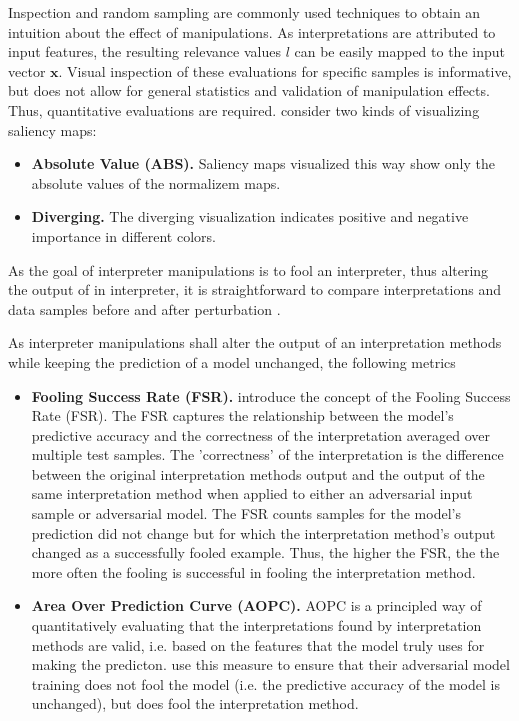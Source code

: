Inspection and random sampling are commonly used techniques to obtain an intuition about the effect of manipulations. 
As interpretations are attributed to input features, the resulting relevance values $l$ can be easily mapped to the input vector $\mathbf{x}$. Visual inspection of these evaluations for specific samples is informative, but does not allow for general statistics and validation of manipulation effects. Thus, quantitative evaluations are required. 
\cite{adebayo2018sanity} consider two kinds of visualizing saliency maps: 
\begin{itemize}
    \item \textbf{Absolute Value (ABS).} Saliency maps visualized this way show only the absolute values of the normalizem maps.
    \item \textbf{Diverging. } The diverging visualization indicates positive and negative importance in different colors. 
\end{itemize}

As the goal of interpreter manipulations is to fool an interpreter, thus altering the output of in interpreter, it is straightforward to compare interpretations and data samples before and after perturbation \cite{ghorbani2019interpretation}.

As interpreter manipulations shall alter the output of an interpretation methods while keeping the prediction of a model unchanged, the following metrics 

\begin{itemize}
    \item \textbf{Fooling Success Rate (FSR).} \cite{fooling_nn_interpreters} introduce the concept of the Fooling Success Rate (FSR). The FSR captures the relationship between the model's predictive accuracy and the correctness of the interpretation averaged over multiple test samples. The 'correctness' of the interpretation is the difference between the original interpretation methods output and the output of the same interpretation method when applied to either an adversarial input sample or adversarial model. 
    The FSR counts samples for the model's prediction did not change but for which the interpretation method's output changed as a successfully fooled example. Thus, the higher the FSR, the the more often the fooling is successful in fooling the interpretation method. 
    \item \textbf{Area Over Prediction Curve (AOPC). } AOPC \cite{samek2016evaluating} is a principled way of quantitatively evaluating that the interpretations found by interpretation methods are valid, i.e. based on the features that the model truly uses for making the predicton. \cite{fooling_nn_interpreters} use this measure to ensure that their adversarial model training does not fool the model (i.e. the predictive accuracy of the model is unchanged), but does fool the interpretation method.
\end{itemize}

